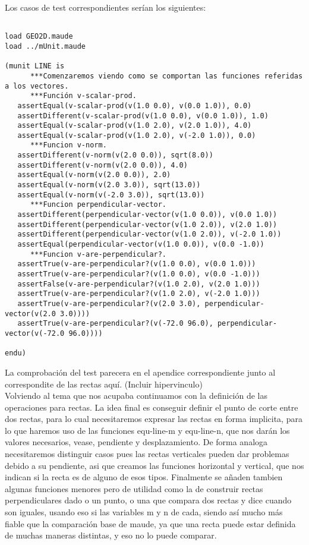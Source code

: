 \documentclass[12pt,a4paper]{book}
\begin{document}
Los casos de test correspondientes ser\'ian los siguientes: \par

\begin{verbatim}

load GEO2D.maude
load ../mUnit.maude

(munit LINE is
      ***Comenzaremos viendo como se comportan las funciones referidas a los vectores.
      ***Función v-scalar-prod.
   assertEqual(v-scalar-prod(v(1.0 0.0), v(0.0 1.0)), 0.0)
   assertDifferent(v-scalar-prod(v(1.0 0.0), v(0.0 1.0)), 1.0)
   assertEqual(v-scalar-prod(v(1.0 2.0), v(2.0 1.0)), 4.0)
   assertEqual(v-scalar-prod(v(1.0 2.0), v(-2.0 1.0)), 0.0)		
      ***Funcion v-norm.
   assertDifferent(v-norm(v(2.0 0.0)), sqrt(8.0))
   assertDifferent(v-norm(v(2.0 0.0)), 4.0)
   assertEqual(v-norm(v(2.0 0.0)), 2.0)
   assertEqual(v-norm(v(2.0 3.0)), sqrt(13.0))
   assertEqual(v-norm(v(-2.0 3.0)), sqrt(13.0))
      ***Funcion perpendicular-vector.
   assertDifferent(perpendicular-vector(v(1.0 0.0)), v(0.0 1.0))
   assertDifferent(perpendicular-vector(v(1.0 2.0)), v(2.0 1.0))
   assertDifferent(perpendicular-vector(v(1.0 2.0)), v(-2.0 1.0))
   assertEqual(perpendicular-vector(v(1.0 0.0)), v(0.0 -1.0))
      ***Funcion v-are-perpendicular?.
   assertTrue(v-are-perpendicular?(v(1.0 0.0), v(0.0 1.0)))
   assertTrue(v-are-perpendicular?(v(1.0 0.0), v(0.0 -1.0)))
   assertFalse(v-are-perpendicular?(v(1.0 2.0), v(2.0 1.0)))
   assertTrue(v-are-perpendicular?(v(1.0 2.0), v(-2.0 1.0)))
   assertTrue(v-are-perpendicular?(v(2.0 3.0), perpendicular-vector(v(2.0 3.0))))
   assertTrue(v-are-perpendicular?(v(-72.0 96.0), perpendicular-vector(v(-72.0 96.0))))

endu)
\end{verbatim}

La comprobaci\'on del test parecera en el apendice correspondiente junto al correspondite de las rectas aqu\'i. (Incluir hipervinculo) \\

Volviendo al tema que nos acupaba continuamos con la definici\'on de las operaciones para rectas. La idea final es conseguir definir el punto de corte entre dos rectas, para lo cual necesitaremos expresar las rectas en forma implicita, para lo que haremos uso de las funciones equ-line-m y equ-line-n, que nos dar\'an los valores necesarios, vease, pendiente y desplazamiento. De forma analoga necesitaremos distinguir casos pues las rectas verticales pueden dar problemas debido a su pendiente, asi que creamos las funciones horizontal y vertical, que nos indican si la recta es de alguno de esos tipos. Finalmente se añaden tambien algunas funciones menores pero de utilidad como la de construir rectas perpendiculares dado o un punto, o una que compara dos rectas y dice cuando son iguales, usando eso si las variables m y n de cada, siendo as\'i mucho m\'as fiable que la comparaci\'on base de maude, ya que una recta puede estar definida de muchas maneras distintas, y eso no lo puede comparar. \par
\end{document}
